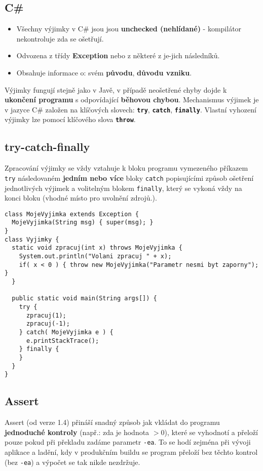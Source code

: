 \subsection{C\#}
\begin{itemize}
\item Všechny výjimky v C\# jsou jsou \textbf{unchecked (nehlídané)} - kompilátor nekontroluje zda se ošetřují.
\item Odvozena z třídy \textbf{Exception} nebo z některé z je-jich následníků.
\item Obsahuje informace o: svém \textbf{původu}, \textbf{důvodu vzniku}.
\end{itemize}
Výjimky fungují stejně jako v Javě, v případě neošetřené chyby dojde k \textbf{ukončení programu} s odpovídající \textbf{běhovou chybou}. Mechanismus výjimek je v jazyce C\# založen na klíčových slovech: \texttt{\textbf{try}}, \texttt{\textbf{catch}}, \texttt{\textbf{finally}}. Vlastní vyhození výjimky lze pomocí klíčového slova \textbf{\texttt{throw}}.

\subsection{try-catch-finally}
Zpracování výjimky se vždy vztahuje k bloku programu vymezeného příkazem \texttt{try} následovaném \textbf{jedním nebo více} bloky \texttt{catch} popisujícími způsob ošetření jednotlivých výjimek a volitelným blokem \texttt{finally}, který se vykoná vždy na konci bloku (vhodné místo pro uvolnění zdrojů.).

\begin{verbatim}
class MojeVyjimka extends Exception { 
  MojeVyjimka(String msg) { super(msg); } 
}
class Vyjimky {
  static void zpracuj(int x) throws MojeVyjimka { 
    System.out.println("Volani zpracuj " + x); 
    if( x < 0 ) { throw new MojeVyjimka("Parametr nesmi byt zaporny"); }
  } 
	
  public static void main(String args[]) { 
    try { 
      zpracuj(1); 
      zpracuj(-1); 
    } catch( MojeVyjimka e ) {  
      e.printStackTrace();  
    } finally {
    }
  } 
}
\end{verbatim}

\subsection{Assert}
Assert (od verze 1.4) přináší snadný způsob jak vkládat do programu \textbf{jednoduché kontroly} (např.: zda je hodnota $> 0$), které se vyhodnotí a přeloží pouze pokud při překladu zadáme parametr \texttt{-ea}. To se hodí zejména při vývoji aplikace a ladění, kdy v produkčním buildu se program přeloží bez těchto kontrol (bez \texttt{-ea}) a výpočet se tak nikde nezdržuje.

